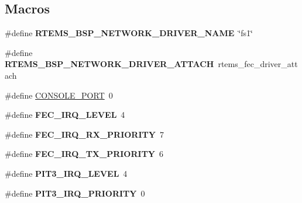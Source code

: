 \subsection*{Macros}
\begin{DoxyCompactItemize}
\item 
\mbox{\label{group__RTEMSBSPsM68kAV5282_ga86d4f9aa98431100692e31068070a8df}} 
\#define {\bfseries R\+T\+E\+M\+S\+\_\+\+B\+S\+P\+\_\+\+N\+E\+T\+W\+O\+R\+K\+\_\+\+D\+R\+I\+V\+E\+R\+\_\+\+N\+A\+ME}~\char`\"{}fs1\char`\"{}
\item 
\mbox{\label{group__RTEMSBSPsM68kAV5282_gadde0d66aef9442971dde465292ac14e6}} 
\#define {\bfseries R\+T\+E\+M\+S\+\_\+\+B\+S\+P\+\_\+\+N\+E\+T\+W\+O\+R\+K\+\_\+\+D\+R\+I\+V\+E\+R\+\_\+\+A\+T\+T\+A\+CH}~rtems\+\_\+fec\+\_\+driver\+\_\+attach
\item 
\#define \mbox{\hyperlink{group__RTEMSBSPsM68kAV5282_ga0859abd84f64f7f09ad95a4079b06f41}{C\+O\+N\+S\+O\+L\+E\+\_\+\+P\+O\+RT}}~0
\item 
\mbox{\label{group__RTEMSBSPsM68kAV5282_gad112ebc14ecfb90715c07100a7eadb07}} 
\#define {\bfseries F\+E\+C\+\_\+\+I\+R\+Q\+\_\+\+L\+E\+V\+EL}~4
\item 
\mbox{\label{group__RTEMSBSPsM68kAV5282_gaf431aa7fcab6144223fd91d6fa311325}} 
\#define {\bfseries F\+E\+C\+\_\+\+I\+R\+Q\+\_\+\+R\+X\+\_\+\+P\+R\+I\+O\+R\+I\+TY}~7
\item 
\mbox{\label{group__RTEMSBSPsM68kAV5282_gac8a869dff9e53d0cc40febabd696fe27}} 
\#define {\bfseries F\+E\+C\+\_\+\+I\+R\+Q\+\_\+\+T\+X\+\_\+\+P\+R\+I\+O\+R\+I\+TY}~6
\item 
\mbox{\label{group__RTEMSBSPsM68kAV5282_ga70573852241aab02cc64e2c8745cd24f}} 
\#define {\bfseries P\+I\+T3\+\_\+\+I\+R\+Q\+\_\+\+L\+E\+V\+EL}~4
\item 
\mbox{\label{group__RTEMSBSPsM68kAV5282_ga5aa390a01c2fd3849f575eeec819ac4a}} 
\#define {\bfseries P\+I\+T3\+\_\+\+I\+R\+Q\+\_\+\+P\+R\+I\+O\+R\+I\+TY}~0
\item 
\mbox{\label{group__RTEMSBSPsM68kAV5282_ga3f6403d98a553ab7e5246ace59655611}} 

\end{DoxyCompactItemize}
